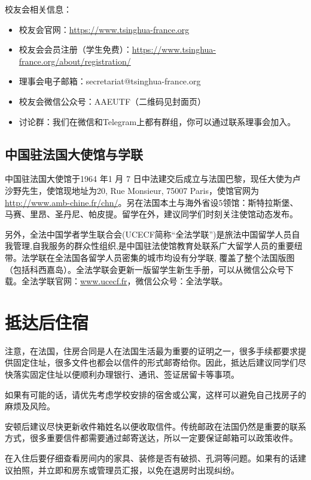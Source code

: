 \documentclass[UTF8]{ctexart}
\begin{document}
校友会相关信息：
\begin{itemize}
    \item 校友会官网：\href{https://www.tsinghua-france.org}{https://www.tsinghua-france.org}
    \item 校友会会员注册（学生免费）：\href{https://www.tsinghua-france.org/about/registration/}{https://www.tsinghua-france.org/about/registration/}
    \item 理事会电子邮箱：secretariat@tsinghua-france.org 
    \item 校友会微信公众号：AAEUTF（二维码见封面页）
    \item 讨论群：我们在微信和Telegram上都有群组，你可以通过联系理事会加入。
\end{itemize}


\subsection{中国驻法国大使馆与学联}

中国驻法国大使馆于1964 年1 月 7 日中法建交后成立与法国巴黎，现任大使为卢沙野先生，使馆现地址为20, Rue Monsieur, 75007 Paris，使馆官网为\href{http://www.amb-chine.fr/chn/}{http://www.amb-chine.fr/chn/}。另在法国本土与海外省设5领馆：斯特拉斯堡、马赛、里昂、圣丹尼、帕皮提。留学在外，建议同学们时刻关注使馆动态发布。

另外，全法中国学者学生联合会(UCECF简称“全法学联”)是旅法中国留学人员自我管理,自我服务的群众性组织,是中国驻法使馆教育处联系广大留学人员的重要纽带。法学联在全法国各留学人员密集的城市均设有分学联, 覆盖了整个法国版图 （包括科西嘉岛）。全法学联会更新一版留学生新生手册，可以从微信公众号下载。全法学联官网：\href{www.ucecf.fr}{www.ucecf.fr}，微信公众号：全法学联。

\newpage
\section{抵达后住宿}

注意，在法国，住房合同是人在法国生活最为重要的证明之一，很多手续都要求提供固定住址，很多文件也都会以信件的形式邮寄给你。因此，抵达后建议同学们尽快落实固定住址以便顺利办理银行、通讯、签证居留卡等事项。

如果有可能的话，请优先考虑学校安排的宿舍或公寓，这样可以避免自己找房子的麻烦及风险。

安顿后建议尽快更新收件箱姓名以便收取信件。传统邮政在法国仍然是重要的联系方式，很多重要信件都需要通过邮寄送达，所以一定要保证邮箱可以政策收件。

在入住后要仔细查看房间内的家具、装修是否有破损、孔洞等问题。如果有的话建议拍照，并立即和房东或管理员汇报，以免在退房时出现纠纷。
\end{document}
